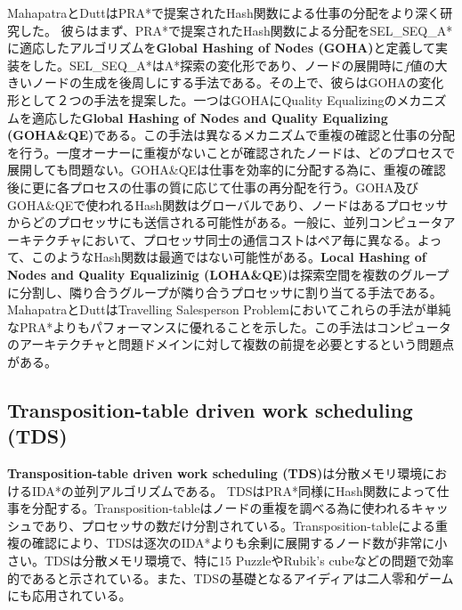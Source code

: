 \documentclass[uplatex]{jsarticle}
\begin{document}
MahapatraとDuttはPRA*で提案されたHash関数による仕事の分配をより深く研究した\cite{mahapatra1997scalable}。
彼らはまず、PRA*で提案されたHash関数による分配をSEL\_SEQ\_A*に適応したアルゴリズムを\textbf{Global Hashing of Nodes (GOHA)}と定義して実装をした。SEL\_SEQ\_A*はA*探索の変化形であり、ノードの展開時に$f$値の大きいノードの生成を後周しにする手法である。その上で、彼らはGOHAの変化形として２つの手法を提案した。一つはGOHAにQuality Equalizingのメカニズムを適応した\textbf{Global Hashing of Nodes and Quality Equalizing (GOHA\&QE)}である。この手法は異なるメカニズムで重複の確認と仕事の分配を行う。一度オーナーに重複がないことが確認されたノードは、どのプロセスで展開しても問題ない。GOHA\&QEは仕事を効率的に分配する為に、重複の確認後に更に各プロセスの仕事の質に応じて仕事の再分配を行う。GOHA及びGOHA\&QEで使われるHash関数はグローバルであり、ノードはあるプロセッサからどのプロセッサにも送信される可能性がある。一般に、並列コンピュータアーキテクチャにおいて、プロセッサ同士の通信コストはペア毎に異なる。よって、このようなHash関数は最適ではない可能性がある。\textbf{Local Hashing of Nodes and Quality Equalizinig (LOHA\&QE)}は探索空間を複数のグループに分割し、隣り合うグループが隣り合うプロセッサに割り当てる手法である。MahapatraとDuttはTravelling Salesperson Problemにおいてこれらの手法が単純なPRA*よりもパフォーマンスに優れることを示した。この手法はコンピュータのアーキテクチャと問題ドメインに対して複数の前提を必要とするという問題点がある。

\subsection{Transposition-table driven work scheduling (TDS)}
\textbf{Transposition-table driven work scheduling (TDS)}は分散メモリ環境におけるIDA*の並列アルゴリズムである\cite{romein1999transposition}。
TDSはPRA*同様にHash関数によって仕事を分配する。Transposition-tableはノードの重複を調べる為に使われるキャッシュであり、プロセッサの数だけ分割されている。Transposition-tableによる重複の確認により、TDSは逐次のIDA*よりも余剰に展開するノード数が非常に小さい。TDSは分散メモリ環境で、特に15 PuzzleやRubik's cubeなどの問題で効率的であると示されている。また、TDSの基礎となるアイディアは二人零和ゲームにも応用されている。



\end{document}
